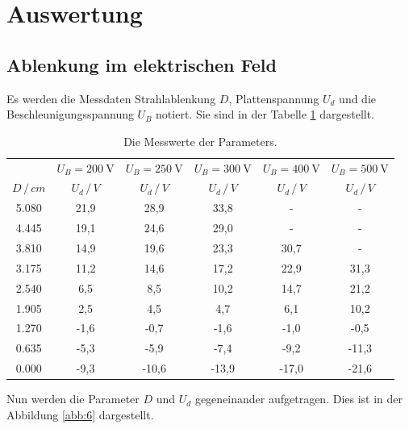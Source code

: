\section{Auswertung}
\subsection{Ablenkung im elektrischen Feld}
Es werden die Messdaten Strahlablenkung $D$, Plattenspannung $U_d$ und die Beschleunigungsspannung $U_B$ notiert.
Sie sind in der Tabelle \ref{tab:1} dargestellt.
\begin{table}[H]
  \centering
  \caption{Die Messwerte der Parameters.}
  \label{tab:1}
  \begin{tabular}{c c c c c c}
\toprule
& \multicolumn{1}{c}{$U_B=\SI{200}{\volt}$} & \multicolumn{1}{c}{$U_B=\SI{250}{\volt}$} &\multicolumn{1}{c}{$U_B=\SI{300}{\volt}$}&\multicolumn{1}{c}{$U_B=\SI{400}{\volt}$}&\multicolumn{1}{c}{$U_B=\SI{500}{\volt}$}\\
\cmidrule(lr){2-2}\cmidrule(lr){3-3}\cmidrule(lr){4-4}\cmidrule(lr){5-5}\cmidrule(lr){6-6}
$D \, / \, cm$ & $U_d \, / \, V$ & $U_d \, / \, V$ & $U_d \, / \, V$ &$U_d \, / \, V$ & $U_d \, / \, V$\\
\midrule
5.080 & 21,9  & 28,9  & 33,8  & -    & -   \\
4.445 & 19,1  & 24,6  & 29,0  & -    & -   \\
3.810 & 14,9  & 19,6  & 23,3  & 30,7 & -   \\
3.175 & 11,2  & 14,6  & 17,2  & 22,9 & 31,3\\
2.540 &  6,5  &  8,5  & 10,2  & 14,7 & 21,2\\
1.905 &  2,5  &  4,5  &  4,7  &  6,1 & 10,2\\
1.270 & -1,6  & -0,7  & -1,6  & -1,0 & -0,5\\
0.635 & -5,3  & -5,9  & -7,4  & -9,2 &-11,3\\
0.000 & -9,3  &-10,6  &-13,9  &-17,0 &-21,6\\
\bottomrule
  \end{tabular}
\end{table}
Nun werden die Parameter $D$ und $U_d$ gegeneinander aufgetragen.
Dies ist in der Abbildung \ref{abb:6} dargestellt.
